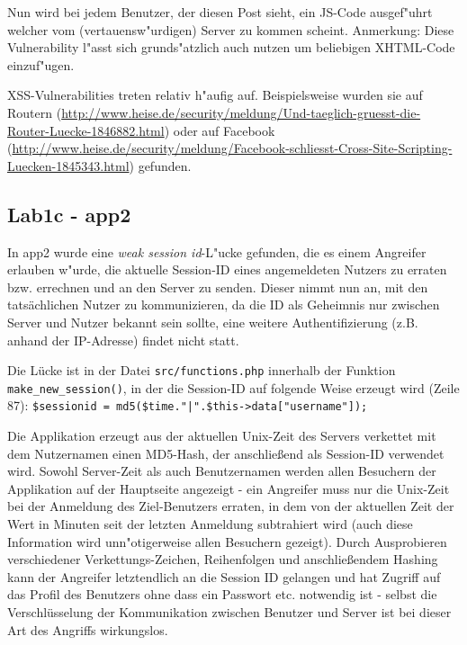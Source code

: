 \documentclass[12pt,a4paper,titlepage,oneside]{scrartcl}
\begin{document}
Nun wird bei jedem Benutzer, der diesen Post sieht, ein JS-Code ausgef"uhrt welcher vom (vertauensw"urdigen) Server zu kommen scheint.\newline
Anmerkung: Diese Vulnerability l"asst sich grunds"atzlich auch nutzen um beliebigen XHTML-Code einzuf"ugen.\newline

XSS-Vulnerabilities treten relativ h"aufig auf. Beispielsweise wurden sie auf Routern (\url{http://www.heise.de/security/meldung/Und-taeglich-gruesst-die-Router-Luecke-1846882.html}) oder auf Facebook (\url{http://www.heise.de/security/meldung/Facebook-schliesst-Cross-Site-Scripting-Luecken-1845343.html}) gefunden.

\subsection{Lab1c - app2}

In app2 wurde eine \textit{weak session id}-L"ucke gefunden, die es einem Angreifer erlauben w"urde, die aktuelle Session-ID eines angemeldeten Nutzers zu erraten bzw. errechnen und an den Server zu senden. Dieser nimmt nun an, mit den tatsächlichen Nutzer zu kommunizieren, da die ID als Geheimnis nur zwischen Server und Nutzer bekannt sein sollte, eine weitere Authentifizierung (z.B. anhand der IP-Adresse) findet nicht statt.

Die Lücke ist in der Datei \texttt{src/functions.php} innerhalb der Funktion \texttt{make\_new\_session()}, in der die Session-ID auf folgende Weise erzeugt wird (Zeile 87): \lstinline{$sessionid = md5($time."|".$this->data["username"]);}

Die Applikation erzeugt aus der aktuellen Unix-Zeit des Servers verkettet mit dem Nutzernamen einen MD5-Hash, der anschließend als Session-ID verwendet wird. Sowohl Server-Zeit als auch Benutzernamen werden allen Besuchern der Applikation auf der Hauptseite angezeigt - ein Angreifer muss nur die Unix-Zeit bei der Anmeldung des Ziel-Benutzers erraten, in dem von der aktuellen Zeit der Wert in Minuten seit der letzten Anmeldung subtrahiert wird (auch diese Information wird unn"otigerweise allen Besuchern gezeigt). Durch Ausprobieren verschiedener Verkettungs-Zeichen, Reihenfolgen und anschließendem Hashing kann der Angreifer letztendlich an die Session ID gelangen und hat Zugriff auf das Profil des Benutzers ohne dass ein Passwort etc. notwendig ist - selbst die Verschlüsselung der Kommunikation zwischen Benutzer und Server ist bei dieser Art des Angriffs wirkungslos.
\end{document}
